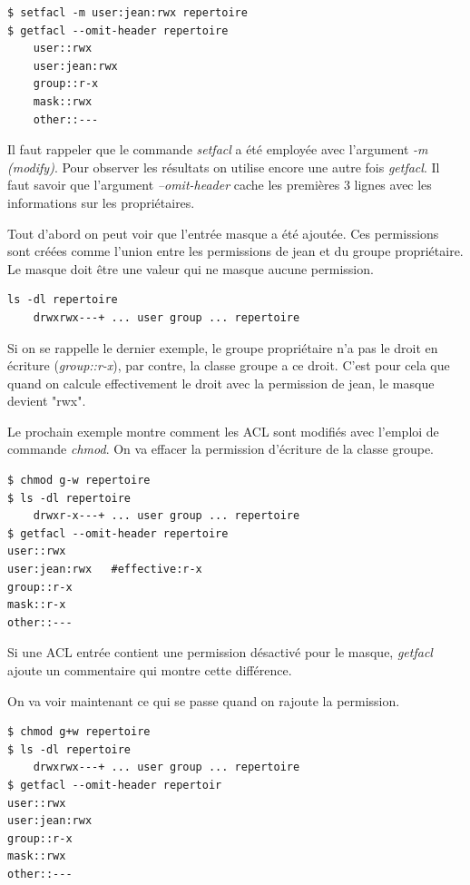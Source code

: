 \documentclass{article}
\begin{document}
\begin{verbatim}
$ setfacl -m user:jean:rwx repertoire
$ getfacl --omit-header repertoire 
	user::rwx 
	user:jean:rwx	
	group::r-x 
	mask::rwx 
	other::---
\end{verbatim}

Il faut rappeler que le commande \emph{setfacl} a été employée avec l'argument \emph{-m (modify)}. Pour observer les résultats on utilise encore une autre fois \emph{getfacl}. Il faut savoir que l'argument \emph{--omit-header} cache les premières 3 lignes avec les informations sur les propriétaires.  

Tout d'abord on peut voir que l'entrée masque a été ajoutée. Ces permissions sont créées comme l'union entre les permissions de jean et du groupe propriétaire. Le masque doit être une valeur qui ne masque aucune permission.  

\begin{verbatim}
ls -dl repertoire
	drwxrwx---+ ... user group ... repertoire
\end{verbatim}

Si on se rappelle le dernier exemple, le groupe propriétaire n'a pas le droit en écriture (\emph{group::r-x}), par contre, la classe groupe a ce droit. C'est pour cela que quand on calcule effectivement le droit avec la permission de jean, le masque devient "rwx".

Le prochain exemple montre comment les ACL sont modifiés avec l'emploi de commande \emph{chmod}. On va effacer la permission d'écriture de la classe groupe.

\begin{verbatim}
$ chmod g-w repertoire 
$ ls -dl repertoire 
	drwxr-x---+ ... user group ... repertoire 
$ getfacl --omit-header repertoire 
user::rwx 
user:jean:rwx 	#effective:r-x
group::r-x 	
mask::r-x 
other::---

\end{verbatim}

Si une ACL entrée contient une permission désactivé pour le masque, \emph{getfacl} ajoute un commentaire qui montre cette différence.

On va voir maintenant ce qui se passe quand on rajoute la permission. 

\begin{verbatim}
$ chmod g+w repertoire 
$ ls -dl repertoire 
	drwxrwx---+ ... user group ... repertoire 
$ getfacl --omit-header repertoir 
user::rwx 
user:jean:rwx 
group::r-x
mask::rwx
other::---
\end{verbatim}
\end{document}
